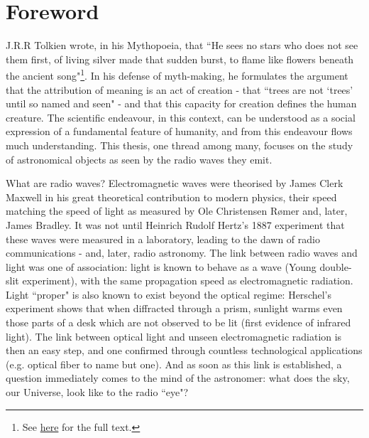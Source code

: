 \chapter*{Foreword}

\pg
J.R.R Tolkien wrote, in his Mythopoeia, that ``He sees no stars who does not see them first, of living silver made that sudden burst, to flame like flowers beneath the ancient song"\footnote{See \href{http://home.agh.edu.pl/~evermind/jrrtolkien/mythopoeia.htm}{here} for the full text.}. In his defense of myth-making, he formulates the argument that the attribution of meaning is an act of creation - that ``trees are not `trees' until so named and seen" - and that this capacity for creation defines the human creature. The scientific endeavour, in this context, can be understood as a social expression of a fundamental feature of humanity, and from this endeavour flows much understanding. This thesis, one thread among many, focuses on the study of astronomical objects as seen by the radio waves they emit.

\pg
What are radio waves? Electromagnetic waves were theorised by James Clerk Maxwell \citep{maxwell} in his great theoretical contribution to modern physics, their speed matching the speed of light as measured by Ole Christensen R\o mer and, later, James Bradley. It was not until Heinrich Rudolf Hertz's 1887 experiment that these waves were measured in a laboratory, leading to the dawn of radio communications - and, later, radio astronomy. The link between radio waves and light was one of association: light is known to behave as a wave (Young double-slit experiment), with the same propagation speed as electromagnetic radiation. Light ``proper" is also known to exist beyond the optical regime: Herschel's experiment shows that when diffracted through a prism, sunlight warms even those parts of a desk which are not observed to be lit (first evidence of infrared light). The link between optical light and unseen electromagnetic radiation is then an easy step, and one confirmed through countless technological applications (e.g. optical fiber to name but one). And as soon as this link is established, a question immediately comes to the mind of the astronomer: what does the sky, our Universe, look like to the radio ``eye"?

